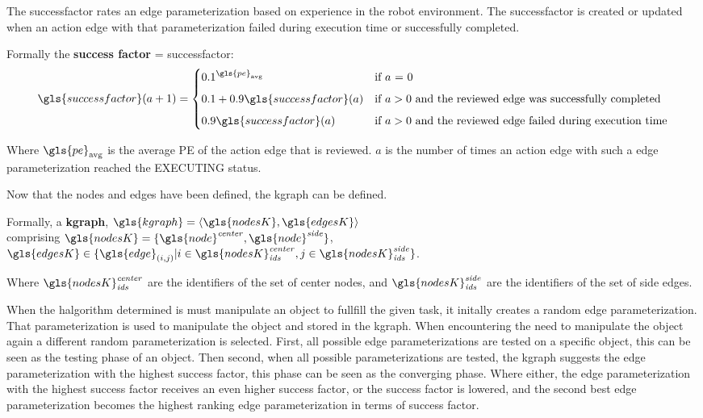 The successfactor rates an edge parameterization based on experience in the robot environment. The successfactor is created or updated when an action edge with that parameterization failed during execution time or successfully completed.\bs

Formally the \textbf{success factor} = \gls{successfactor}:
\[\gls{successfactor}(a+1) =
  \begin{cases} 0.1^{\gls{pe}_\textrm{avg}}& \textrm{if $a$ = 0}\\[5px]
    0.1 + 0.9\gls{successfactor}(a) & \textrm{if $a > 0$ and the reviewed edge was successfully completed}\\[5px]
  0.9\gls{successfactor}(a) & \textrm{if $a > 0$ and the reviewed edge failed during execution time}
\end{cases}\]

Where $\gls{pe}_\textrm{avg}$ is the average \ac{PE} of the action edge that is reviewed. $a$ is the number of times an action edge with such a edge parameterization reached the EXECUTING status.\bs

\noindent Now that the nodes and edges have been defined, the \ac{kgraph} can be defined.\bs

Formally, a \textbf{\acl{kgraph}}, $\gls{kgraph} = \left\langle \gls{nodesK}, \gls{edgesK} \right\rangle $
\\comprising $\gls{nodesK} = \{\gls{node}^{\mathit{center}}, \gls{node}^{\mathit{side}}\}$, \quad $\gls{edgesK} \in \{\gls{edge}_{(i,j)}| i \in \gls{nodesK}^\mathit{center}_\mathit{ids}, j \in \gls{nodesK}^\mathit{side}_\mathit{ids} \}$.\bs

Where $\gls{nodesK}^\mathit{center}_\mathit{ids}$ are the identifiers of the set of center nodes, and $\gls{nodesK}^\mathit{side}_\mathit{ids}$ are the identifiers of the set of side edges.\bs

When the \ac{halgorithm} determined is must manipulate an object to fullfill the given task, it initally creates a random edge parameterization. That parameterization is used to manipulate the object and stored in the \ac{kgraph}. When encountering the need to manipulate the object again a different random parameterization is selected. First, all possible edge parameterizations are tested on a specific object, this can be seen as the testing phase of an object. Then second, when all possible parameterizations are tested, the \ac{kgraph} suggests the edge parameterization with the highest success factor, this phase can be seen as the converging phase. Where either, the edge parameterization with the highest success factor receives an even higher success factor, or the success factor is lowered, and the second best edge parameterization becomes the highest ranking edge parameterization in terms of success factor.\bs


